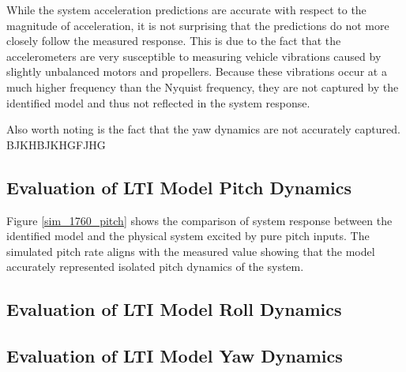 While the system acceleration predictions are accurate with respect to the magnitude of acceleration, it is not surprising that the predictions do not more closely follow the measured response. This is due to the fact that the accelerometers are very susceptible to measuring vehicle vibrations caused by slightly unbalanced motors and propellers. Because these vibrations occur at a much higher frequency than the Nyquist frequency, they are not captured by the identified model and thus not reflected in the system response.

Also worth noting is the fact that the yaw dynamics are not accurately captured. BJKHBJKHGFJHG


\subsection{Evaluation of LTI Model Pitch Dynamics}
Figure \ref{sim_1760_pitch} shows the comparison of system response between the identified model and the physical system excited by pure pitch inputs. The simulated pitch rate aligns with the measured value showing that the model accurately represented isolated pitch dynamics of the system.


\subsection{Evaluation of LTI Model Roll Dynamics}


\subsection{Evaluation of LTI Model Yaw Dynamics}

